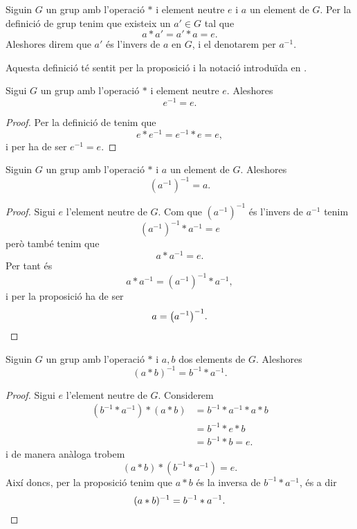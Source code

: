 \documentclass[../../Main.tex]{subfiles}
\begin{document}
	\begin{definition}
		\label{def:l'invers d'un element d'un grup}
		Siguin \(G\) un grup amb l'operació \(\ast\) i element neutre \(e\) i \(a\) un element de \(G\). Per la definició de grup tenim que existeix un \(a'\in G\) tal que
		\[a\ast a'=a'\ast a=e.\]
		Aleshores direm que \(a'\) és l'invers de \(a\) en \(G\), i el denotarem per \(a^{-1}\).
		
		Aquesta definició té sentit per la proposició  i la notació introduïda en .
	\end{definition}
	\begin{proposition}
		\label{prop:l'invers de l'element neutre d'un grup és ell mateix}
		Sigui \(G\) un grup amb l'operació \(\ast\) i element neutre \(e\). Aleshores
		\[e^{-1}=e.\]
		\begin{proof}
			Per la definició de  tenim que
			\[e\ast e^{-1}=e^{-1}\ast e=e,\]
			i per ha de ser \(e^{-1}=e\).
		\end{proof}
	\end{proposition}
	\begin{proposition}
		\label{prop:grups:l'invers de l'invers d'un element es l'element}
		Siguin \(G\) un grup amb l'operació \(\ast\) i \(a\) un element de \(G\). Aleshores
		\[\left(a^{-1}\right)^{-1}=a.\]
		\begin{proof}
			Sigui \(e\) l'element neutre de \(G\). Com que \(\left(a^{-1}\right)^{-1}\) és l'invers de \(a^{-1}\) tenim
			\[\left(a^{-1}\right)^{-1}\ast a^{-1}=e\]
			però també tenim que
			\[a\ast a^{-1}=e.\]
			Per tant és
			\[a\ast a^{-1}=(a^{-1})^{-1}\ast a^{-1},\]
			i per la proposició  ha de ser
			\[a=\left(a^{-1}\right)^{-1}.\qedhere\]
		\end{proof}
	\end{proposition}
	\begin{proposition}
		\label{prop:invers de a b = b invers a invers}
		Siguin \(G\) un grup amb l'operació \(\ast\) i \(a,b\) dos elements de \(G\). Aleshores
		\[(a\ast b)^{-1}=b^{-1}\ast a^{-1}.\]
		\begin{proof}
			Sigui \(e\) l'element neutre de \(G\). Considerem
			\begin{align*}
			(b^{-1}\ast a^{-1})\ast(a\ast b)&=b^{-1}\ast a^{-1}\ast a\ast b\\
			&=b^{-1}\ast e\ast b\\
			&=b^{-1}\ast b=e.
			\end{align*}
			i de manera anàloga trobem
			\[(a\ast b)\ast(b^{-1}\ast a^{-1})=e.\]
			Així doncs, per la proposició  tenim que \(a\ast b\) és la inversa de \(b^{-1}\ast a^{-1}\), és a dir
			\[(a\ast b)^{-1}=b^{-1}\ast a^{-1}.\qedhere\]
		\end{proof}
	\end{proposition}
\end{document}
